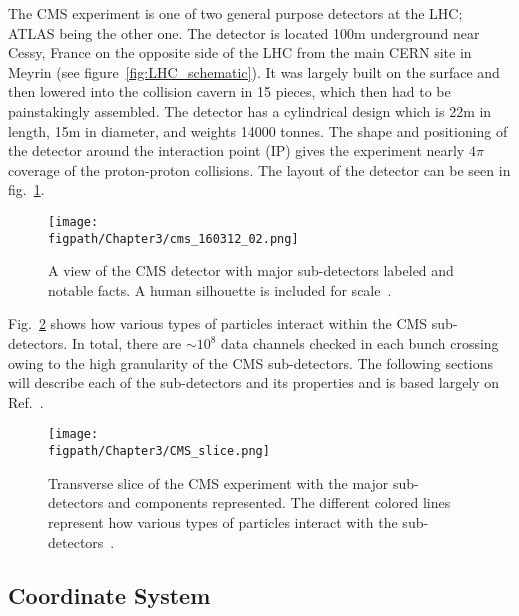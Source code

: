 The CMS experiment is one of two general purpose detectors at the LHC; ATLAS being the other one.
The detector is located 100\unit{m} underground near Cessy, France on the opposite side of the LHC from the main CERN site in Meyrin (see figure~\ref{fig:LHC_schematic}).
It was largely built on the surface and then lowered into the collision cavern in 15 pieces, which then had to be painstakingly assembled.
The detector has a cylindrical design which is 22\unit{m} in length, 15\unit{m} in diameter, and weights 14000 tonnes.
The shape and positioning of the detector around the interaction point (IP) gives the experiment nearly $4\pi$ coverage of the proton-proton collisions.
The layout of the detector can be seen in fig.~\ref{fig:CMS_schematic}.

\begin{figure}[!hbt]
    \centering
    \texttt{[image: \\figpath/Chapter3/cms\_160312\_02.png]}
    \caption{A view of the CMS detector with major sub-detectors labeled and notable facts. A human silhouette is included for scale~\cite{SketchUpCMS}.}
    \label{fig:CMS_schematic}
\end{figure}

Fig.~\ref{fig:CMS_transverse} shows how various types of particles interact within the CMS sub-detectors.
In total, there are ${\sim}10^8$ data channels checked in each bunch crossing owing to the high granularity of the CMS sub-detectors.
The following sections will describe each of the sub-detectors and its properties and is based largely on Ref.~\cite{Chatrchyan:2008aa}.

\begin{figure}[!hbt]
    \centering
    \texttt{[image: \\figpath/Chapter3/CMS\_slice.png]}
    \caption{Transverse slice of the CMS experiment with the major sub-detectors and components represented. The different colored lines represent how various types of particles interact with the sub-detectors~\cite{CMSSlice}.}
    \label{fig:CMS_transverse}
\end{figure}

\subsection{Coordinate System}

